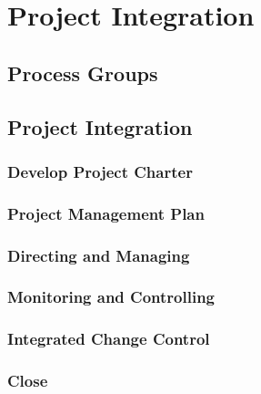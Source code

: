 \chapter{Project Integration}

\section{Process Groups}

\section{Project Integration}

\subsection{Develop Project Charter}

\subsection{Project Management Plan}

\subsection{Directing and Managing}

\subsection{Monitoring and Controlling}

\subsection{Integrated Change Control}

\subsection{Close}